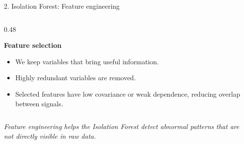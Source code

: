 \documentclass[10pt,aspectratio=169]{beamer}
\begin{document}
\begin{frame}{2. Isolation Forest: Feature engineering}
\begin{columns}[T,onlytextwidth]
\begin{column}{0.48\textwidth}
\vspace{0.25cm}

{\bfseries Feature selection}

\vspace{0.15cm}

\begin{itemize}
    \footnotesize
    \item We keep variables that bring useful information.
    \item Highly redundant variables are removed.
    \item Selected features have low covariance or weak dependence, reducing overlap between signals.
\end{itemize}

\end{column}

\end{columns}

\vspace{0.25cm}

\begin{center}
\footnotesize
\textit{Feature engineering helps the Isolation Forest detect abnormal patterns that are not directly visible in raw data.}
\end{center}

\end{frame}
\end{document}
